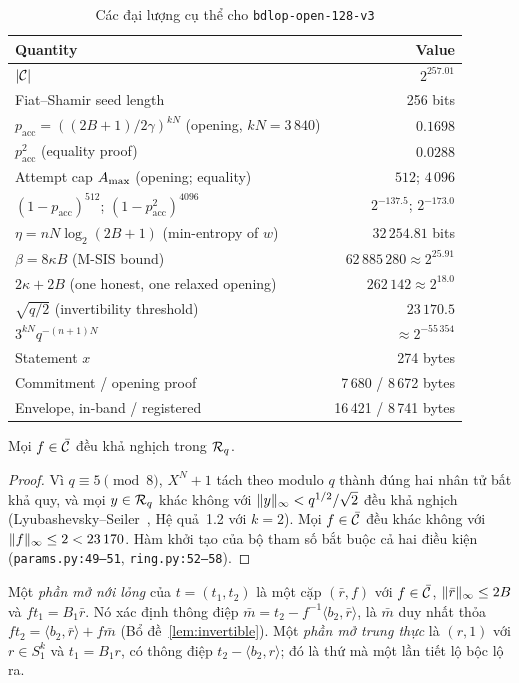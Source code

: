 \begin{table}[t]
\centering
\caption{Các đại lượng cụ thể cho \texttt{bdlop-open-128-v3}}
\label{tab:sec-numbers}
\footnotesize
\begin{tabular}{@{}lr@{}}
\toprule
Quantity & Value \\
\midrule
$|\mathcal{C}|$ & $2^{257.01}$\\
Fiat--Shamir seed length & 256 bits\\
$p_{\mathrm{acc}}=((2B+1)/2\gamma)^{kN}$ (opening, $kN=3\,840$) & $0.1698$\\
$p_{\mathrm{acc}}^2$ (equality proof) & $0.0288$\\
Attempt cap $A_{\max}$ (opening; equality) & $512$; $4\,096$\\
$(1-p_{\mathrm{acc}})^{512}$; $(1-p_{\mathrm{acc}}^2)^{4096}$ & $2^{-137.5}$; $2^{-173.0}$\\
$\eta=nN\log_2(2B+1)$ (min-entropy of $w$) & $32\,254.81$ bits\\
$\beta=8\kappa B$ (M-SIS bound) & $62\,885\,280\approx2^{25.91}$\\
$2\kappa+2B$ (one honest, one relaxed opening) & $262\,142\approx2^{18.0}$\\
$\sqrt{q/2}$ (invertibility threshold) & $23\,170.5$\\
$3^{kN}q^{-(n+1)N}$ & $\approx2^{-55\,354}$\\
Statement $x$ & 274 bytes\\
Commitment / opening proof & 7\,680 / 8\,672 bytes\\
Envelope, in-band / registered & 16\,421 / 8\,741 bytes\\
\bottomrule
\end{tabular}
\end{table}

\begin{lemma}
\label{lem:invertible}
Mọi $f\in\bar{\mathcal{C}}$ đều khả nghịch trong $\mathcal{R}_q$.
\end{lemma}
\begin{proof}
Vì $q\equiv5\pmod8$, $X^N+1$ tách theo modulo $q$ thành đúng hai nhân tử bất
khả quy, và mọi $y\in\mathcal{R}_q$ khác không với $\lVert y \rVert_\infty<q^{1/2}/\sqrt2$ đều
khả nghịch (Lyubashevsky--Seiler~\cite{ref:ls18}, Hệ quả~1.2 với $k=2$). Mọi
$f\in\bar{\mathcal{C}}$ đều khác không với $\lVert f \rVert_\infty\le2<23\,170$. Hàm khởi tạo của
bộ tham số bắt buộc cả hai điều kiện (\texttt{params.py:49--51},
\texttt{ring.py:52--58}).
\end{proof}

\begin{definition}
\label{def:relaxed}
Một \emph{phần mở nới lỏng} của $t=(t_1,t_2)$ là một cặp $(\bar r,f)$ với
$f\in\bar{\mathcal{C}}$, $\lVert \bar r \rVert_\infty\le2B$ và $ft_1=B_1\bar r$. Nó xác định thông
điệp $\bar m=t_2-f^{-1}\langle b_2,\bar r\rangle$, là $\bar m$ duy nhất thỏa
$ft_2=\langle b_2,\bar r\rangle+f\bar m$ (Bổ đề~\ref{lem:invertible}). Một
\emph{phần mở trung thực} là $(r,1)$ với $r\in S_1^k$ và $t_1=B_1r$, có thông
điệp $t_2-\langle b_2,r\rangle$; đó là thứ mà một lần tiết lộ bộc lộ ra.
\end{definition}

